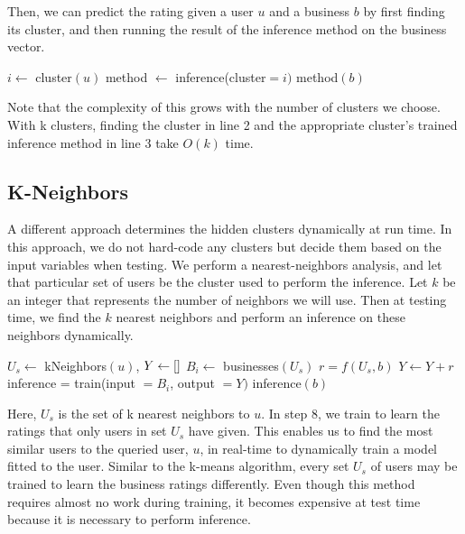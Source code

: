 \documentclass[11pt]{article}
\begin{document}
Then, we can predict the rating given a user $u$ and a business $b$ by first finding its cluster, and then running the result of the inference method on the business vector.\\

\begin{algorithmic}[1]
\State $i \gets$ cluster$(u)$ 
\State method $\gets$ inference(cluster$=i)$ 
\State \Return method$(b)$
\EndFunction
\end{algorithmic}
\medskip

Note that the complexity of this grows with the number of clusters we choose. With k clusters, finding the cluster in line 2 and the appropriate cluster's trained inference method in line 3 take $O(k)$ time.

\subsection{K-Neighbors}
A different approach determines the hidden clusters dynamically at run time. In this approach, we do not hard-code any clusters but decide them based on the input variables when testing. We perform a nearest-neighbors analysis, and let that particular set of users be the cluster used to perform the inference. Let $k$ be an integer that represents the number of neighbors we will use. Then at testing time, we find the $k$ nearest neighbors and perform an inference on these neighbors dynamically.\\

\begin{algorithmic}[1]
	\State $U_s \gets$ kNeighbors$(u)$, $Y \gets \small[ \small]$
	\State $B_i \gets$ businesses$(U_s)$ 
	\State $r = f(U_s, b)$ 
	\State $Y \gets Y + r$
	\EndFor
	\State inference = train(input $=B_i$, output $=Y)$ 
	\State \Return inference$(b)$
	\EndFunction
\end{algorithmic}
\medskip

Here, $U_s$ is the set of k nearest neighbors to $u$. In step 8, we train to learn the ratings that only users in set $U_s$ have given. This enables us to find the most similar users to the queried user, $u$, in real-time to dynamically train a model fitted to the user. Similar to the k-means algorithm, every set $U_s$ of users may be trained to learn the business ratings differently. Even though this method requires almost no work during training, it becomes expensive at test time because it is necessary to perform inference.
\end{document}
